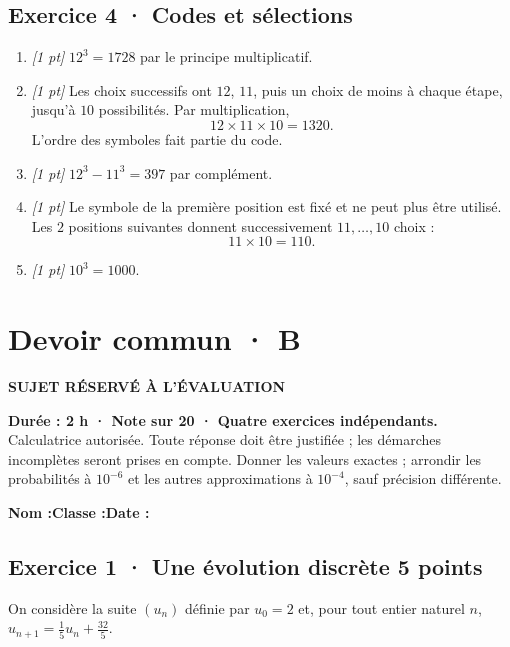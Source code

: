 \subsection*{Exercice 4 · Codes et sélections}\begin{enumerate}

\item \textit{[1 pt]} $12^3=1728$ par le principe multiplicatif.

\item \textit{[1 pt]} Les choix successifs ont $12$, $11$, puis un choix de moins à chaque étape, jusqu'à $10$ possibilités. Par multiplication,
\[12\times11\times10=1320.\]
L'ordre des symboles fait partie du code.

\item \textit{[1 pt]} $12^3-11^3=397$ par complément.

\item \textit{[1 pt]} Le symbole de la première position est fixé et ne peut plus être utilisé. Les $2$ positions suivantes donnent successivement $11,\ldots,10$ choix :
\[11\times10=110.\]

\item \textit{[1 pt]} $10^3=1000$.

\end{enumerate}

\fi

\fi

\ifprof

\clearpage{}\label{sujet:3-4}

\section*{Devoir commun · B}

{\sffamily\bfseries\color{amber}SUJET RÉSERVÉ À L'ÉVALUATION\par}

\textbf{Durée : 2 h · Note sur 20 · Quatre exercices indépendants.}\\Calculatrice autorisée. Toute réponse doit être justifiée ; les démarches incomplètes seront prises en compte. Donner les valeurs exactes ; arrondir les probabilités à $10^{-6}$ et les autres approximations à $10^{-4}$, sauf précision différente.

\smallskip\textbf{Nom :}\enspace\dotfill\quad\textbf{Classe :}\enspace\dotfill\quad\textbf{Date :}\enspace\dotfill

\subsection*{Exercice 1 · Une évolution discrète \hfill 5 points}On considère la suite $(u_n)$ définie par $u_0=2$ et, pour tout entier naturel $n$, $u_{n+1}=\frac{1}{5}u_n+\frac{32}{5}$.

